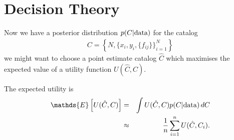 \documentclass[a4paper, 12pt]{article}
\newcommand{\data}{\textnormal{data}}
\begin{document}
\section{Decision Theory}
Now we have a posterior distribution $p(C|\data)$ for the catalog
\begin{eqnarray}
C = \left\{N,\{x_i, y_i, \{f_{ij}\}\}_{i=1}^N \right\}
\end{eqnarray}
we might want to choose a point estimate catalog $\hat{C}$ which
maximises the expected value of a utility function $U(\hat{C}, C)$.

The expected utility is
\begin{eqnarray}
\mathds{E}\left[U(\hat{C}, C)\right]
&=&
\int U(\hat{C}, C) p(C | \data) \, dC \\
&\approx&
\frac{1}{n} \sum_{i=1}^n U(\hat{C}, C_i).
\end{eqnarray}
\end{document}
